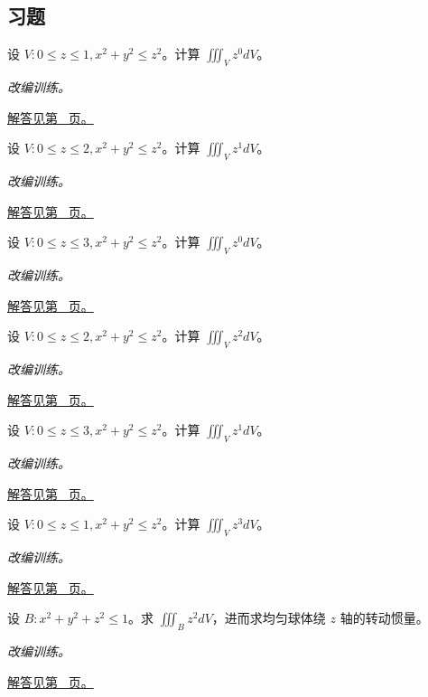 \documentclass[UTF8,12pt,a4paper,fontset=fandol]{ctexart}
\begin{document}
\subsection{习题}
\begin{example}[圆锥的分层积分]\label{ex:c39q1}
设 $V:0\le z\le 1, x^2+y^2\le z^2$。计算 $\iiint_Vz^{0}dV$。
\par\textit{改编训练。}\par\hyperref[ans:c39q1]{解答见第~\pageref{ans:c39q1} 页。}
\end{example}
\begin{example}[圆锥的分层积分]\label{ex:c39q2}
设 $V:0\le z\le 2, x^2+y^2\le z^2$。计算 $\iiint_Vz^{1}dV$。
\par\textit{改编训练。}\par\hyperref[ans:c39q2]{解答见第~\pageref{ans:c39q2} 页。}
\end{example}
\begin{example}[圆锥的分层积分]\label{ex:c39q3}
设 $V:0\le z\le 3, x^2+y^2\le z^2$。计算 $\iiint_Vz^{0}dV$。
\par\textit{改编训练。}\par\hyperref[ans:c39q3]{解答见第~\pageref{ans:c39q3} 页。}
\end{example}
\begin{example}[圆锥的分层积分]\label{ex:c39q4}
设 $V:0\le z\le 2, x^2+y^2\le z^2$。计算 $\iiint_Vz^{2}dV$。
\par\textit{改编训练。}\par\hyperref[ans:c39q4]{解答见第~\pageref{ans:c39q4} 页。}
\end{example}
\begin{example}[圆锥的分层积分]\label{ex:c39q5}
设 $V:0\le z\le 3, x^2+y^2\le z^2$。计算 $\iiint_Vz^{1}dV$。
\par\textit{改编训练。}\par\hyperref[ans:c39q5]{解答见第~\pageref{ans:c39q5} 页。}
\end{example}
\begin{example}[圆锥的分层积分]\label{ex:c39q6}
设 $V:0\le z\le 1, x^2+y^2\le z^2$。计算 $\iiint_Vz^{3}dV$。
\par\textit{改编训练。}\par\hyperref[ans:c39q6]{解答见第~\pageref{ans:c39q6} 页。}
\end{example}
\begin{example}[球内坐标平方的积分]\label{ex:c39q7}
设 $B:x^2+y^2+z^2\le 1$。求 $\iiint_Bz^2dV$，进而求均匀球体绕 $z$ 轴的转动惯量。
\par\textit{改编训练。}\par\hyperref[ans:c39q7]{解答见第~\pageref{ans:c39q7} 页。}
\end{example}
\end{document}
